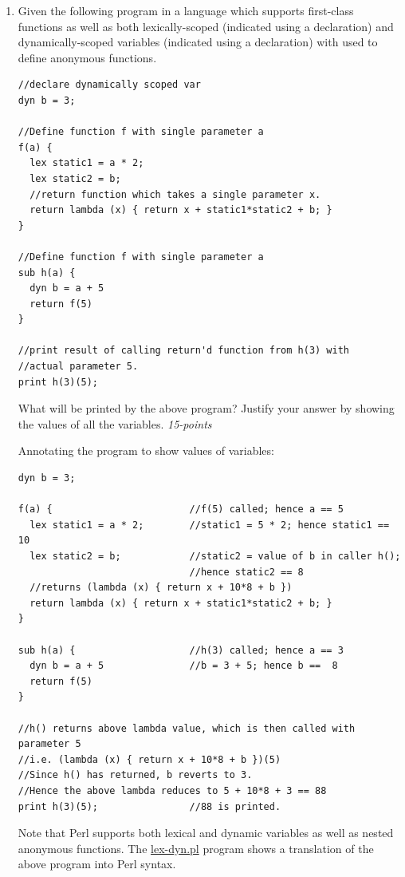 \documentclass[12pt]{article}
\begin{document}
\begin{enumerate}
\item Given the following program in a language which supports
 first-class functions as well as both lexically-scoped (indicated
 using a \verb@lex@ declaration) and dynamically-scoped variables
 (indicated using a \verb@dyn@ declaration) with \verb@lambda@ used to
 define anonymous functions.

\begin{verbatim}
//declare dynamically scoped var
dyn b = 3;

//Define function f with single parameter a
f(a) {
  lex static1 = a * 2; 
  lex static2 = b; 
  //return function which takes a single parameter x.
  return lambda (x) { return x + static1*static2 + b; }
}

//Define function f with single parameter a
sub h(a) {
  dyn b = a + 5
  return f(5)
}

//print result of calling return'd function from h(3) with 
//actual parameter 5.
print h(3)(5);

\end{verbatim}

What will be printed by the above program?  Justify your answer by showing the
values of all the variables.  \hfill{\textit{15-points}}

Annotating the program to show values of variables:

\begin{verbatim}
dyn b = 3;

f(a) {                        //f(5) called; hence a == 5
  lex static1 = a * 2;        //static1 = 5 * 2; hence static1 == 10
  lex static2 = b;            //static2 = value of b in caller h(); 
                              //hence static2 == 8
  //returns (lambda (x) { return x + 10*8 + b })
  return lambda (x) { return x + static1*static2 + b; }
}

sub h(a) {                    //h(3) called; hence a == 3
  dyn b = a + 5               //b = 3 + 5; hence b ==  8
  return f(5)
}

//h() returns above lambda value, which is then called with parameter 5
//i.e. (lambda (x) { return x + 10*8 + b })(5)
//Since h() has returned, b reverts to 3.
//Hence the above lambda reduces to 5 + 10*8 + 3 == 88
print h(3)(5);                //88 is printed.
\end{verbatim}

Note that Perl supports both lexical and dynamic variables as well as
nested anonymous functions.  The \href{./lex-dyn.pl}{lex-dyn.pl} program shows
a translation of the above program into Perl syntax.


\end{enumerate}
\end{document}
